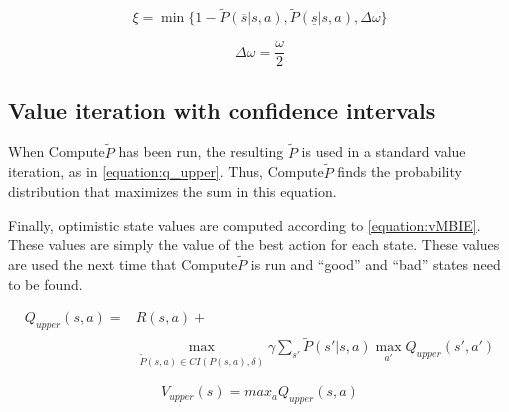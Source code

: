 \begin{equation}
\label{equation:xi}
\xi = \min\{
  1 - \tilde{P}(\overline{s} | s, a)
  , \tilde{P}(\underline{s} | s, a)
  , \Delta \omega 
\}
\end{equation}

\begin{equation}
\label{equation:deomega}
  \Delta \omega = \frac{\omega}{2}
\end{equation}


\label{goto}



\subsection{Value iteration with confidence intervals}
\label{sec:modification_conf_interval}
When Compute$\tilde{P}$ has been run, the resulting $\tilde{P}$ is used in a standard value
iteration, as in \eqref{equation:q_upper}. Thus, Compute$\tilde{P}$ finds the probability distribution that maximizes the sum in this equation. 

Finally, optimistic state values are computed according to \eqref{equation:vMBIE}. These values are simply the value of the best action for each state. These values are used the next time that Compute$\tilde{P}$ is run and ``good'' and ``bad'' states need to be found. 

\begin{comment}
The confidence  bounds on the Q-values in the MBIE-algorithm are calculated by
making a maximally optimistic estimation of these values, given some confidence
parameter. The less times a state-action pair has been visited, the more
optimistic this estimation will be. This has the effect of promoting
exploration of actions that have been taken few times. 

When a state is first encountered by the agent, the Q-values associated with
the state are initialized with the maximum achievable reward. When the actions
are later performed, the state-action pairs have their Q-values gradually
decreased depending on the expected value. Given time, the confidence bounds will
become smaller and smaller, and the policy will converge to optimal actions
with confidence specified by a confidence parameter. The bound for the
confidence interval on a Q-value can be calculated by iterating the following
equation (cf. section~\ref{sec:valueiteration} about the basic value iteration
algorithm) for all state-action pairs until it converges:
\end{comment}

\begin{align}
\label{equation:q_upper}
Q_{upper} (s, a) = & R(s, a) + \nonumber \\
& \operatorname*{max}_{\tilde{P}(s, a)\in CI(P(s, a), \delta)} \gamma \sum_{s'} \tilde{P}(s'|s, a)\operatorname*{max}_{a'} Q_{upper}(s', a')
\end{align}


\begin{equation}
\label{equation:vMBIE}
V_{upper}(s) = max_aQ_{upper}(s,a)
\end{equation}
